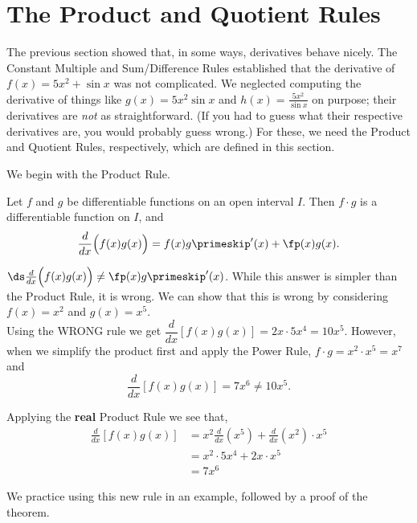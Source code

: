\section{The Product and Quotient Rules}\label{sec:prod_quot_rules}

The previous section showed that, in some ways, derivatives behave nicely. The Constant Multiple and Sum/Difference Rules established that the derivative of $f(x) = 5x^2+\sin x $ was not complicated. We neglected computing the derivative of things like $g(x) = 5x^2\sin x$ and $h(x) = \frac{5x^2}{\sin x}$ on purpose; their derivatives are \textit{not} as straightforward. (If you had to guess what their respective derivatives are, you would probably guess wrong.) For these, we need the Product and Quotient Rules, respectively, which are defined in this section. 

We begin with the Product Rule.

{Let $f$ and $g$ be differentiable functions on an open interval $I$. Then $f\cdot g$ is a differentiable function on $I$, and \[\frac{d}{dx}\Big(f(x)g(x)\Big) = f(x)g\primeskip'(x) + \fp(x)g(x).\]}

 $\ds\frac{d}{dx}\Big(f(x)g(x)\Big) \neq \fp(x)g\primeskip'(x)$. While this answer is simpler than the Product Rule, it is wrong.  We can show that this is wrong by considering \\
$f(x)=x^2$ and $g(x)=x^5$. \\
Using the WRONG rule we get $\dfrac{d}{dx}[f(x)g(x)] =2x \cdot 5x^4 = 10x^5$. However, when we simplify the product first and apply the Power Rule, $f \cdot g = x^2 \cdot x^5 = x^7$ and 
\[\frac{d}{dx}[f(x)g(x)] = 7x^6 \neq 10x^5.\]

Applying the \textbf{real} Product Rule we see that,
\begin{align*}
\frac{d}{dx}[f(x)g(x)]
& = x^2 \frac{d}{dx} (x^5) + \frac{d}{dx} (x^2) \cdot x^5 \\ 
& = x^2 \cdot 5x^4+2x \cdot x^5 \\ 
&= 7x^6
\end{align*}


We practice using this new rule in an example, followed by a proof of the theorem.

